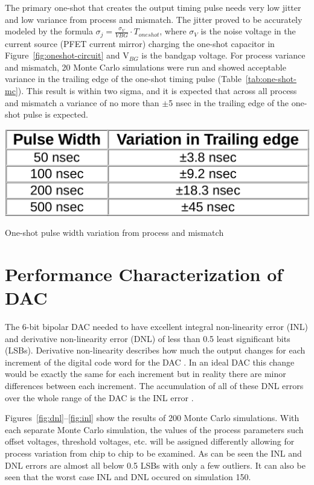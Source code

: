 \documentclass[12pt,oneside,final]{siuethesis}
\theoremstyle{definition}
\begin{document}
\par The primary one-shot that creates the output timing pulse needs very low jitter and low variance from process and mismatch. The jitter proved to be accurately modeled by the formula $\sigma_{j} = \frac{\sigma_{V}}{V{BG}}\cdot T_{oneshot}$, where $\sigma_{V}$ is the noise voltage in the current source (PFET current mirror) charging the one-shot capacitor in Figure~\ref{fig:oneshot-circuit} and V$_{BG}$ is the bandgap voltage. For process variance and mismatch, 20 Monte Carlo simulations were run and showed acceptable variance in the trailing edge of the one-shot timing pulse (Table~\ref{tab:one-shot-mc}). This result is within two sigma, and it is expected that across all process and mismatch a variance of no more than $\pm$5 nsec in the trailing edge of the one-shot pulse is expected.

\begin{table}[htbp!]
 \centering
 \includegraphics[scale=.25,keepaspectratio=true]{../data/oneshot_mc.png}
 \caption{One-shot pulse width variation from process and mismatch}
 \label{tab:one-shot-mc}
\end{table}

\section{Performance Characterization of DAC}
\par The 6-bit bipolar DAC needed to have excellent integral non-linearity error (INL) and derivative non-linearity error (DNL) of less than 0.5 least significant bits (LSBs). Derivative non-linearity describes how much the output changes for each increment of the digital code word for the DAC \cite{ALLEN}. In an ideal DAC this change would be exactly the same for each increment but in reality there are minor differences between each increment. The accumulation of all of these DNL errors over the whole range of the DAC is the INL error \cite{ALLEN}. 

\par Figures~\ref{fig:dnl}--\ref{fig:inl} show the results of 200 Monte Carlo simulations. With each separate Monte Carlo simulation, the values of the process parameters such offset voltages, threshold voltages, etc. will be assigned differently allowing for process variation from chip to chip to be examined. As can be seen the INL and DNL errors are almost all below 0.5 LSBs with only a few outliers. It can also be seen that the worst case INL and DNL occured on simulation 150.
\end{document}

